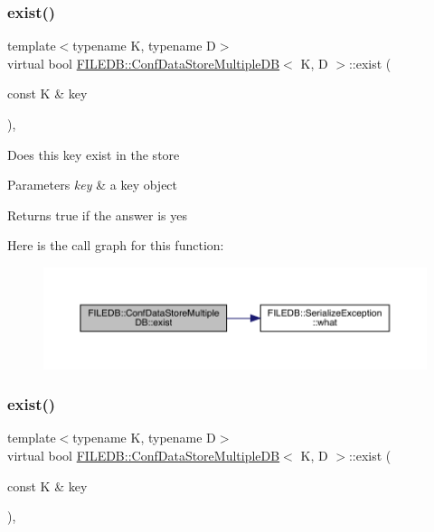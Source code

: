 \subsubsection{\texorpdfstring{exist()}{exist()}\hspace{0.1cm}{\footnotesize\ttfamily [1/3]}}
{\footnotesize\ttfamily template$<$typename K, typename D$>$ \\
virtual bool \mbox{\hyperlink{classFILEDB_1_1ConfDataStoreMultipleDB}{F\+I\+L\+E\+D\+B\+::\+Conf\+Data\+Store\+Multiple\+DB}}$<$ K, D $>$\+::exist (\begin{DoxyParamCaption}\item[{const K \&}]{key }\end{DoxyParamCaption})\hspace{0.3cm}{\ttfamily [inline]}, {\ttfamily [virtual]}}

Does this key exist in the store 
\begin{DoxyParams}{Parameters}
{\em key} & a key object \\
\hline
\end{DoxyParams}
\begin{DoxyReturn}{Returns}
true if the answer is yes 
\end{DoxyReturn}
Here is the call graph for this function\+:
\nopagebreak
\begin{figure}[H]
\begin{center}
\leavevmode
\includegraphics[width=350pt]{d3/dc0/classFILEDB_1_1ConfDataStoreMultipleDB_ad80312a9a4767f3b0b567932542d3ee7_cgraph}
\end{center}
\end{figure}
\mbox{\label{classFILEDB_1_1ConfDataStoreMultipleDB_ad80312a9a4767f3b0b567932542d3ee7}} 
\subsubsection{\texorpdfstring{exist()}{exist()}\hspace{0.1cm}{\footnotesize\ttfamily [2/3]}}
{\footnotesize\ttfamily template$<$typename K, typename D$>$ \\
virtual bool \mbox{\hyperlink{classFILEDB_1_1ConfDataStoreMultipleDB}{F\+I\+L\+E\+D\+B\+::\+Conf\+Data\+Store\+Multiple\+DB}}$<$ K, D $>$\+::exist (\begin{DoxyParamCaption}\item[{const K \&}]{key }\end{DoxyParamCaption})\hspace{0.3cm}{\ttfamily [inline]}, {\ttfamily [virtual]}}

